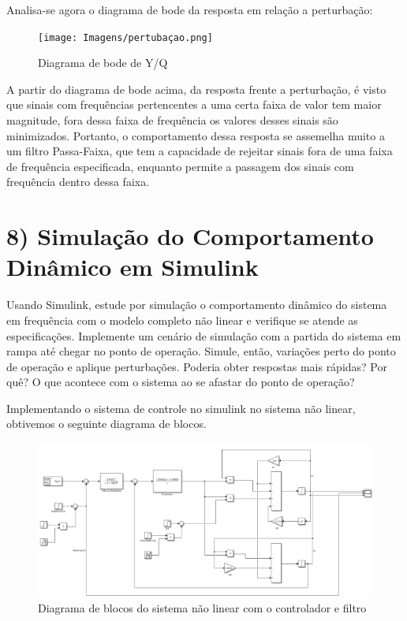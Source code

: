 \documentclass[a4paper,12pt]{report}
\begin{document}
Analisa-se agora o diagrama de bode da resposta em relação a perturbação:

\begin{figure}[H]
    \centering
    \texttt{[image: Imagens/pertubaçao.png]}
    \caption{Diagrama de bode de Y/Q}
    \label{fig:enter-label}
\end{figure}

A partir do diagrama de bode acima, da resposta frente a perturbação, é visto que sinais com frequências pertencentes a uma certa faixa de valor tem maior magnitude, fora dessa faixa de frequência os valores desses sinais são minimizados. Portanto, o comportamento dessa resposta se assemelha muito a um filtro Passa-Faixa, que tem a capacidade de rejeitar sinais fora de uma faixa de frequência especificada, enquanto permite a passagem dos sinais com frequência dentro dessa faixa.



\section{8) Simulação do Comportamento Dinâmico em Simulink}

Usando Simulink, estude por simulação o comportamento dinâmico do sistema em frequência com o modelo completo não linear e verifique se atende as especificações. Implemente um cenário de simulação com a partida do sistema em rampa até chegar no ponto de operação. Simule, então, variações perto do ponto de operação e aplique perturbações. Poderia obter respostas mais rápidas? Por quê? O que acontece com o sistema ao se afastar do ponto de operação?

Implementando o sistema de controle no simulink no sistema não linear, obtivemos o seguinte diagrama de blocos.

\begin{figure}[H]
    \centering
    \includegraphics[width=0.8\linewidth]{diagramablocos.png}
    \caption{Diagrama de blocos do sistema não linear com o controlador e filtro}
    \label{fig:enter-label}
\end{figure}
\end{document}
